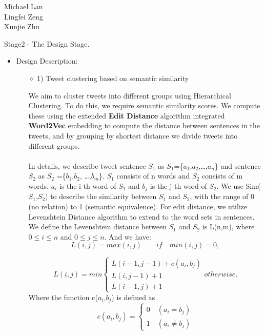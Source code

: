 \documentclass[10pt]{article}
\begin{document}
\begin{raggedright}
Michael Lan \\
Lingfei Zeng \\
Xunjie Zhu \\
\end{raggedright}

\vspace{5mm} 

Stage2 - The Design Stage. 
\begin{itemize} 
\item{ Design Description:\\} 
\begin{itemize}
There are three types of users who will use this system. We will begin with the first user type: 1) users who select a topic and bring up a cluster of tweets related to that topic.

\item[$\diamond$]{1) Tweet clustering based on semantic similarity}

We aim to cluster tweets into different groups using Hierarchical Clustering. To do this, we require semantic similarity scores. We compute these using the extended {\bf Edit Distance} algorithm integrated {\bf Word2Vec} embedding to compute the distance between sentences in the tweets, and by grouping by shortest distance we divide tweets into different groups. \\\\
In details, we describe tweet sentence $S_1$ as $S_1$=\{$a_1$,$a_2$,…,$a_n$\} and sentence $S_2$ as $S_2$ =\{$b_1$,$b_2$, …,$b_m$\}. $S_1$ consists of n words and $S_2$ consists of m words. $a_i$ is the i th word of $S_1$ and $b_j$ is the j th word of $S_2$. We use Sim($S_1$,$S_2$) to describe the similarity between $S_1$ and $S_2$, with the range of 0 (no relation) to 1 (semantic equivalence). For edit distance, we utilize Levenshtein Distance algorithm to extend to the word sets in sentences. We define the Levenshtein distance between $S_1$ and $S_2$ is L(n,m), where  \(0\leq i\leq n\) and \(0\leq j\leq n\). And we have: \[L(i, j) = max(i, j)  \qquad   if \quad min(i,j)=0, \]  

$$
L(i, j) = min
\left\{
\begin{array}{ll}
L(i-1, j-1) + c(a_i,b_j) \\
L(i, j-1) +1 \\
L(i-1, j) +1
\end{array}
\right.
otherwise.
$$
Where the function c($a_i$,$b_j$) is defined as
$$
c(a_i, b_j)=
\left\{
\begin{array}{ll}
0 \quad (a_i = b_j) \\
1 \quad (a_i \neq b_j)
\end{array}
\right.
$$


\end{itemize}
\end{itemize}
\end{document}
